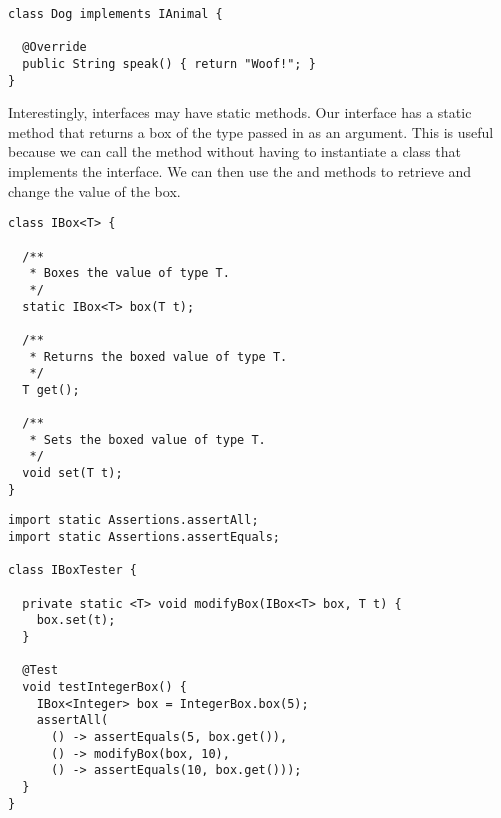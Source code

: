 \begin{lstlisting}[language=MyJava]
class Dog implements IAnimal {

  @Override
  public String speak() { return "Woof!"; }
}
\end{lstlisting}


Interestingly, interfaces may have static methods. Our  interface has a static  method that returns a box of the type passed in as an argument. This is useful because we can call the  method without having to instantiate a class that implements the  interface. We can then use the  and  methods to retrieve and change the value of the box.


\begin{lstlisting}[language=MyJava]
class IBox<T> {
  
  /**
   * Boxes the value of type T.
   */
  static IBox<T> box(T t);

  /**
   * Returns the boxed value of type T.
   */
  T get();

  /**
   * Sets the boxed value of type T.
   */
  void set(T t);
}
\end{lstlisting}

\begin{lstlisting}[language=MyJava]
import static Assertions.assertAll;
import static Assertions.assertEquals;

class IBoxTester {

  private static <T> void modifyBox(IBox<T> box, T t) {
    box.set(t);
  }
  
  @Test
  void testIntegerBox() {
    IBox<Integer> box = IntegerBox.box(5);
    assertAll(
      () -> assertEquals(5, box.get()),
      () -> modifyBox(box, 10),
      () -> assertEquals(10, box.get()));
  }
}
\end{lstlisting}


